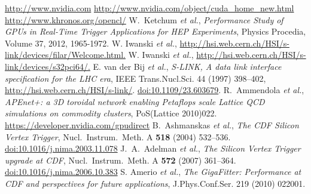 \documentclass[journal]{IEEEtran}
\begin{document}
\begin{thebibliography}{99}
 \url{http://www.nvidia.com}
\url{http://www.nvidia.com/object/cuda_home_new.html}
\url{http://www.khronos.org/opencl/}
 W.~Ketchum \textit{et al.}, \emph{Performance Study of GPUs in Real-Time Trigger Applications for HEP Experiments},  Physics Procedia, Volume 37, 2012, 1965-1972.
 W. Iwanski \emph{et al.}, \url{http://hsi.web.cern.ch/HSI/s-link/devices/filar/Welcome.html.}
 W. Iwanski \emph{et al.}, \url{http://hsi.web.cern.ch/HSI/s-link/devices/s32pci64/.}
 E. van der Bij \emph{et al.}, \emph{S-LINK, A data link interface specification for the LHC era}, IEEE Trans.Nucl.Sci. 44 (1997) 398–402,
\url{http://hsi.web.cern.ch/HSI/s-link/}. \href{http://dx.doi.org/10.1109/23.603679}{doi:10.1109/23.603679}.
 R.~Ammendola \textit{et al.}, \textit{APEnet+: a 3D 
toroidal network enabling Petaflops scale Lattice QCD simulations on 
commodity clusters},  PoS(Lattice 2010)022.
 \url{https://developer.nvidia.com/gpudirect}
 B.~Ashmanskas \emph{et al.}, \emph{The CDF Silicon
    Vertex Trigger}, Nucl.~Instrum.~Meth. A \textbf{518} (2004) 532–536. \href{http://dx.doi.org/10.1016/j.nima.2003.11.078}{doi:10.1016/j.nima.2003.11.078}
 J.~A.~Adelman \emph{et al.}, \emph{The Silicon
    Vertex Trigger upgrade at CDF}, Nucl.~Instrum.~Meth. A \textbf{572} (2007)
  361–364. 
\href{http://dx.doi.org/10.1016/j.nima.2006.10.383}{doi:10.1016/j.nima.2006.10.383}
 S. Amerio \emph{et al.}, \emph{The GigaFitter: Performance at CDF and perspectives for future applications}, J.Phys.Conf.Ser. 219 (2010)
022001.
\end{thebibliography}
\end{document}
